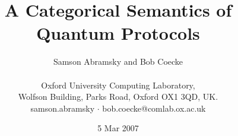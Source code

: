 \documentclass[10pt]{article}
\begin{document}
  

\newcommand{\bpf}{\noindent {\bf Proof:} }
\def\endproof{\hfill$\Box$} 

\newcommand{\cnot}{\textsc{\footnotesize CNOT}}
\newcommand{\bit}{\begin{itemize}}
\newcommand{\eit}{\end{itemize}\par\noindent}
\newcommand{\ben}{\begin{enumerate}}
\newcommand{\een}{\end{enumerate}\par\noindent}
\newcommand{\beq}{\begin{equation}}
\newcommand{\eeq}{\end{equation}\par\noindent}
\newcommand{\beqa}{\begin{eqnarray*}}
\newcommand{\eeqa}{\end{eqnarray*}\par\noindent} 
\newcommand{\beqn}{\begin{eqnarray}}  
\newcommand{\eeqn}{\end{eqnarray}\par\noindent}           

\newcommand{\dd}{\llcorner}
\newcommand{\sdot}{\bullet}
\newcommand{\ddd}{\lrcorner}
\newcommand{\uu}{\ulcorner} 
\newcommand{\uuu}{\urcorner}
\newcommand{\ot}{\otimes}

\newcommand{\HH}{\mathcal{H}}
\newcommand{\KK}{\mathcal{K}}
\newcommand{\ie}{\textit{i.e.}\ }
\newcommand{\Zero}{\mathbf{0}}
\newcommand{\CC}{\mathbf{C}}
\newcommand{\II}{{\rm I}}
\newcommand{\PP}{{\rm P}}
\newcommand{\bra}{\mathsf{bra}}
\newcommand{\FdHilb}{\mathbf{FdHilb}}

\newcommand{\neoiota}{\psi}

\newtheorem{Th}{Theorem}[section] 
\newtheorem{theorem}[Th]{Theorem} 
\newtheorem{proposition}[Th]{Proposition} 
\newtheorem{lemma}[Th]{Lemma} 
\newtheorem{corollary}[Th]{Corollary} 
\newtheorem{definition}[Th]{Definition} 
\newtheorem{example}[Th]{Example} 

\title{\Large A Categorical Semantics of Quantum Protocols}  
\date{5 Mar 2007}
\author{Samson Abramsky and Bob Coecke\\ \\
Oxford University Computing Laboratory,\\ 
Wolfson Building, Parks  
Road, Oxford OX1 3QD, UK.\\ {\sf\small samson.abramsky $\cdot$
bob.coecke@comlab.ox.ac.uk}\\
}  
\end{document}
